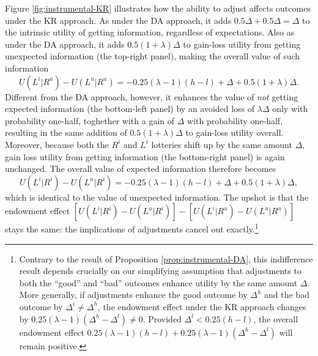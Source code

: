 Figure \ref{fig:instrumental-KR} illustrates how the ability to adjust affects outcomes under the KR approach. As under the DA approach, it adds $0.5 \Delta + 0.5 \Delta = \Delta$ to the intrinsic utility of getting information, regardless of expectations. Also as under the DA approach, it adds $0.5 (1+\lambda) \Delta$ to gain-loss utility from getting unexpected information (the top-right panel), making the overall value of such information
\begin{equation*}
  U(L^i|R^u)-U(L^u|R^u)=-0.25(\lambda-1)(h-l)+\Delta+0.5(1+\lambda)\Delta.
\end{equation*}
Different from the DA approach, however, it enhances the value of \emph{not} getting expected information (the bottom-left panel) by an avoided loss of $\lambda \Delta$ only with probability one-half, toghether with a gain of $\Delta$ with probability one-half, resulting in the same addition of $0.5(1+\lambda)\Delta$ to gain-loss utility overall. Moreover, because both the $R^i$ and $L^i$ lotteries shift up by the same amount $\Delta$, gain loss utility from getting information (the bottom-right panel) is again unchanged. The overall value of expected information therefore becomes
\begin{equation*}
  U(L^i|R^i)-U(L^u|R^i)=-0.25(\lambda-1)(h-l)+\Delta+0.5(1+\lambda)\Delta,
\end{equation*}
which is identical to the value of unexpected information. The upshot is that the endowment effect $[U(L^i|R^i)-U(L^u|R^i)]-[U(L^i|R^u)-U(L^u|R^u)]$ stays the same: the implications of adjustments cancel out exactly.\footnote{Contrary to the result of Proposition \ref{prop:instrumental-DA}, this indifference result depends crucially on our simplifying assumption that adjustments to both the \enquote{good} and \enquote{bad} outcomes enhance utility by the same amount $\Delta$. More generally, if adjustments enhance the good outcome by $\Delta^h$ and the bad outcome by $\Delta^i \neq \Delta^h$, the endowment effect under the KR approach changes by $0.25(\lambda-1)(\Delta^h-\Delta^l) \neq 0$. Provided $\Delta^l<0.25(h-l)$, the overall endowment effect $0.25(\lambda-1)(h-l)+0.25(\lambda-1)(\Delta^h-\Delta^l)$ will remain positive.}

\FloatBarrier
